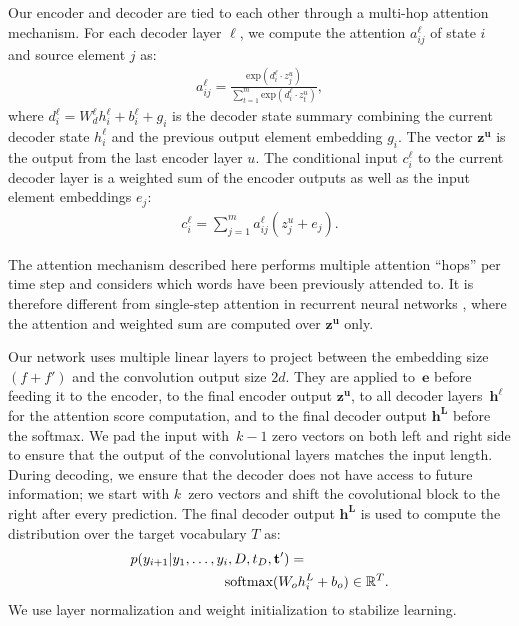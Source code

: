 Our encoder and decoder are tied to each other through a multi-hop
attention mechanism. For each decoder layer $\ell$, we compute the
attention $a^{\ell}_{ij}$ of state $i$ and source element $j$ as:
\begin{align}
a^{\ell}_{ij} = \frac{\mbox{exp}(d^{\ell}_i \cdot z^u_j)}{\sum^m_{t=1} \mbox{exp}(d^{\ell}_i \cdot z^u_t)}, \label{eq:attention}
\end{align}
\noindent where $d^{\ell}_i = W^{\ell}_dh^{\ell}_i+b^{\ell}_i+g_i$ is
the decoder state summary combining the current decoder state
$h^{\ell}_i$ and the previous output element embedding $g_i$. The
vector $\mathbf{z^u}$ is the output from the last encoder layer
$u$. The conditional input $c^{\ell}_i$ to the current decoder layer
is a weighted sum of the encoder outputs as well as the input element
embeddings $e_j$:
\begin{align}
c^{\ell}_i = \sum^m_{j=1} a^{\ell}_{ij}(z^u_j+e_j). \label{eq:decinput}
\end{align}

The attention mechanism described here performs multiple attention
``hops'' per time step and considers which words have been previously
attended to. It is therefore different from single-step attention in
recurrent neural networks \cite{bahdanau-arxiv14}, where the attention
and weighted sum are computed over $\mathbf{z^u}$ only.

Our network uses multiple linear layers to project between the
embedding size $(f+f')$ and the convolution output size $2d$. They are
applied to~$\mathbf{e}$ before feeding it to the encoder, to the final
encoder output $\mathbf{z^u}$, to all decoder layers~$\mathbf{h^{\ell}}$
for the attention score computation, and to the final decoder output
$\mathbf{h^L}$ before the softmax.  We pad the input with~$k-1$ zero
vectors on both left and right side to ensure that the output of the
convolutional layers matches the input length. During decoding, we
ensure that the decoder does not have access to future information; we
start with $k$~zero vectors and shift the covolutional block to the
right after every prediction. The final decoder output $\mathbf{h^L}$
is used to compute the distribution over the target vocabulary $T$ as:
%
\begin{align}
  p(y_{i+1}|y_1,\ldots,y_i,D,t_D,\mathbf{t'}) = & \\
& \hspace*{-2cm}\mbox{softmax}(W_oh^L_i+b_o) \in \mathbb{R}^T. \label{eq:prediction}
\end{align}
%
We use layer normalization and weight initialization to
stabilize learning. 



